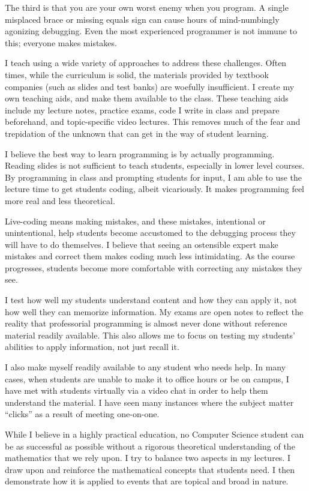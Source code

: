 \documentclass[12pt,a4paper]{article}
\begin{document}
The third is that you are your own worst enemy when you program.
A single misplaced brace or missing equals sign can cause hours of mind-numbingly agonizing debugging.
Even the most experienced programmer is not immune to this; everyone makes mistakes.

I teach using a wide variety of approaches to address these challenges.
Often times, while the curriculum is solid, the materials provided by textbook companies (such as slides and test banks) are woefully insufficient.
I create my own teaching aids, and make them available to the class.
These teaching aids include my lecture notes, practice exams, code I write in class and prepare beforehand, and topic-specific video lectures.
This removes much of the fear and trepidation of the unknown that can get in the way of student learning.

I believe the best way to learn programming is by actually programming.
Reading slides is not sufficient to teach students, especially in lower level courses.
By programming in class and prompting students for input, I am able to use the lecture time to get students coding, albeit vicariously.
It makes programming feel more real and less theoretical.

Live-coding means making mistakes, and these mistakes, intentional or unintentional, help students become accustomed to the debugging process they will have to do themselves.
I believe that seeing an ostensible expert make mistakes and correct them makes coding much less intimidating.
As the course progresses, students become more comfortable with correcting any mistakes they see.


I test how well my students understand content and how they can apply it, not how well they can memorize information.
My exams are open notes to reflect the reality that professorial programming is almost never done without reference material readily available.
This also allows me to focus on testing my students' abilities to apply information, not just recall it.

I also make myself readily available to any student who needs help.
In many cases, when students are unable to make it to office hours or be on campus, I have met with students virtually via a video chat in order to help them understand the material.
I have seen many instances where the subject matter ``clicks'' as a result of meeting one-on-one.



While I believe in a highly practical education, no Computer Science student can be as successful as possible without a rigorous theoretical understanding of the mathematics that we rely upon.
I try to balance two aspects in my lectures.
I draw upon and reinforce the mathematical concepts that students need. 
I then demonstrate how it is applied to events that are topical and broad in nature.
\end{document}
